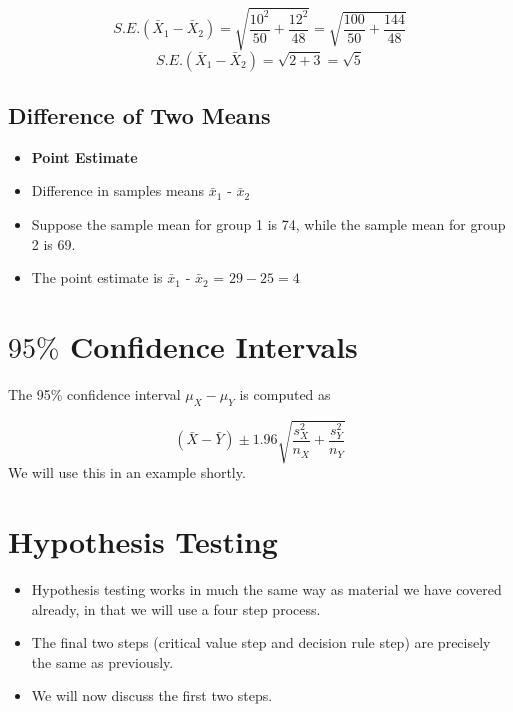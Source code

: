 \documentclass[]{report}
\begin{document}
{\vspace{0.3cm}
\[ S.E.(\bar{X}_1 - \bar{X}_2) = \sqrt{\frac{10^2}{50} + \frac{12^2}{48}} =\sqrt{\frac{100}{50}+\frac{144}{48}}\]
\vspace{0.3cm}
\[ S.E.(\bar{X}_1 - \bar{X}_2)  = \sqrt{2 + 3} =\sqrt{5} \]






\subsection{Difference of Two Means}


\begin{itemize}
\item \textbf{Point Estimate}
\item Difference in samples means $\bar{x}_1$ - $\bar{x}_2$
\item Suppose the sample mean for group 1 is 74, while the sample mean for
group 2 is 69.
\item The point estimate is $\bar{x}_1$ - $\bar{x}_2$ = $29 - 25 = 4$
\end{itemize}










\section{$95\%$ Confidence Intervals}
The 95\% confidence interval $\mu_X - \mu_Y$ is computed as

\[ (\bar{X} - \bar{Y}) \pm 1.96 \sqrt{\frac{s^2_X}{n_X} + \frac{s^2_Y}{n_Y}}\]
We will use this in an example shortly.


\section{Hypothesis Testing}
\begin{itemize}
\item Hypothesis testing works in much the same way as material we have covered already, in that we will use a four step process.
\item The final two steps (critical value step and decision rule step) are precisely the same as previously.
\item We will now discuss the first two steps.
\end{itemize}



}
\end{document}

